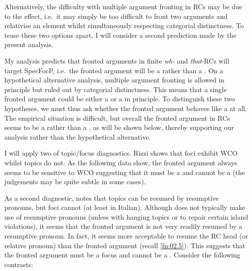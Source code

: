 \documentclass[output=paper]{langsci/langscibook}
\begin{document}
\label{ex:2.84}
\z
Alternatively, the difficulty with multiple argument fronting in
\glspl{RC} may be due to the 
effect, i.e.\ it may simply be too difficult to front two arguments and
relativise an element whilst simultaneously respecting categorial distinctness.
To tease these two options apart, I will consider a second prediction made by
the present analysis.

My analysis predicts that fronted arguments in finite \emph{wh-} and
\emph{that}-\glspl{RC} will target SpecFocP, i.e.\ the fronted argument will be a
 rather than a . On a hypothetical alternative analysis, multiple
argument fronting is allowed in principle but ruled out by categorial
distinctness. This means that a single fronted argument could be either a 
or a  in principle. To distinguish these two hypotheses, we must thus ask
whether the fronted argument behaves like a  at all. The empirical
situation is difficult, but overall the fronted argument in \glspl{RC} seems to be a
 rather than a , as will be shown below, thereby supporting our
analysis rather than the hypothetical alternative.

I will apply two of  topic/focus diagnostics. Rizzi shows
that foci exhibit \gls{WCO} whilst topics do not. As the following data show,
the fronted argument always seems to be sensitive to
\gls{WCO} suggesting that it must be a  and cannot be a  (the
judgements may be quite subtle in some cases).

\ea\label{ex:2.85}
    \z
\ex\label{ex:2.86}
    \z
\z
As a second diagnostic, \textcite{Rizzi1997} notes that topics can be resumed by
resumptive pronouns, but foci cannot (at least in Italian). Although 
does not typically make use of resumptive pronouns (unless with hanging topics
or to repair certain island violations), it seems that the fronted argument is
not very readily resumed by a resumptive pronoun. In fact, it seems more
acceptable to resume the \gls{RC} head (or relative pronoun) than the fronted
argument (recall \cref{fn:02.5}). This suggests that the fronted argument must be a
focus and cannot be a . Consider the following contrasts:
\end{document}
